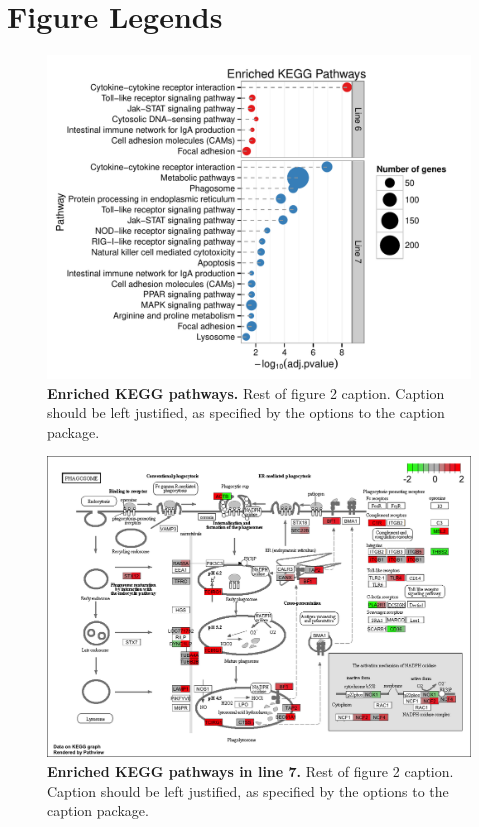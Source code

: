 \documentclass[10pt]{article}
\begin{document}
\section*{Figure Legends}
\begin{figure}[!ht]
\begin{center}
\includegraphics[width=7in]{line67_KEGG_cleveland.pdf}
\end{center}
\caption{
{\bf Enriched KEGG pathways.} Rest of figure 2  caption.  Caption 
should be left justified, as specified by the options to the caption 
package.
}
\label{line67_kegg}
\end{figure}

\begin{figure}[!ht]
\begin{center}
\includegraphics[width=6in]{gga04145_degenes_multi.png}
\end{center}
\caption{
{\bf Enriched KEGG pathways in line 7.}  Rest of figure 2  caption.  Caption 
should be left justified, as specified by the options to the caption 
package.
}
\label{kegg_phagosome}
\end{figure}
\end{document}

